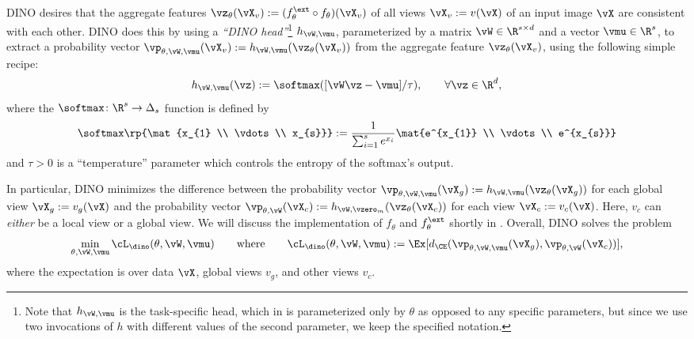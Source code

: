\documentclass[../../book-main.tex]{subfiles}
\begin{document}
DINO desires that the aggregate features \(\vz_{\theta}(\vX_{v}) := (f_{\theta}^{\ext} \circ f_{\theta})(\vX_{v})\) of all views \(\vX_{v} := v(\vX)\) of an input image \(\vX\) are consistent with each other. DINO does this by using a \textit{``DINO head''}\footnote{Note that \(h_{\vW, \vmu}\) is the task-specific head, which in  is parameterized only by \(\theta\) as opposed to any specific parameters, but since we use two invocations of \(h\) with different values of the second parameter, we keep the specified notation.} \(h_{\vW, \vmu}\), parameterized by a matrix \(\vW \in \R^{s \times d}\) and a vector \(\vmu \in \R^{s}\), to extract a probability vector \(\vp_{\theta, \vW, \vmu}(\vX_{v}) := h_{\vW, \vmu}(\vz_{\theta}(\vX_{v}))\) from the aggregate feature \(\vz_{\theta}(\vX_{v})\), using the following simple recipe:
\begin{equation}
    h_{\vW, \vmu}(\vz) := \softmax([\vW\vz - \vmu]/\tau), \qquad \forall \vz \in \R^{d},
\end{equation}
where the \(\softmax \colon \R^{s} \to \Delta_{s}\) function is defined by 
\begin{equation}
    \softmax\rp{\mat{x_{1} \\ \vdots \\ x_{s}}} := \frac{1}{\sum_{i = 1}^{s}e^{x_{i}}}\mat{e^{x_{1}} \\ \vdots \\ e^{x_{s}}}
\end{equation}
and \(\tau > 0\) is a ``temperature'' parameter which controls the entropy of the softmax's output.

In particular, DINO minimizes the difference between the probability vector \(\vp_{\theta, \vW, \vmu}(\vX_{g}) := h_{\vW, \vmu}(\vz_{\theta}(\vX_{g}))\) for each global view \(\vX_{g} := v_{g}(\vX)\) and the probability vector \(\vp_{\theta, \vW}(\vX_{c}) := h_{\vW, \vzero_{m}}(\vz_{\theta}(\vX_{c}))\) for each view \(\vX_{c} := v_{c}(\vX)\). Here, \(v_{c}\) can \textit{either} be a local view or a global view. We will discuss the implementation of \(f_{\theta}\) and \(f_{\theta}^{\ext}\) shortly in . Overall, DINO solves the problem
 \begin{equation}\label{eq:dino_loss}
     \min_{\theta, \vW, \vmu}\cL_{\dino}(\theta, \vW, \vmu) \qquad \text{where} \qquad \cL_{\dino}(\theta, \vW, \vmu) := \Ex[d_{\CE}(\vp_{\theta, \vW, \vmu}(\vX_{g}), \vp_{\theta, \vW}(\vX_{c}))],
\end{equation}
where the expectation is over data \(\vX\), global views \(v_{g}\), and other views \(v_{c}\).
\end{document}
